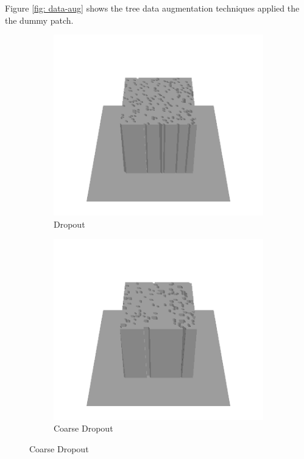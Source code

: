 \documentclass[../document.tex]{subfiles}
\begin{document}
Figure \ref{fig: data-aug} shows the tree data augmentation techniques applied the the dummy patch.
\begin{figure}[htbp]
    \centering
        \begin{subfigure}[b]{0.32\textwidth}
            \includegraphics[width=\textwidth]{../img/data-aug/3d/center-dropout-mayavi.png}
            \caption{Dropout}
        \end{subfigure}
        \begin{subfigure}[b]{0.32\linewidth}
            \includegraphics[width=\textwidth]{../img/data-aug/3d/center-coarse-dropout-mayavi.png}
            \caption{Coarse Dropout}
            \end{subfigure}    


\end{figure}
\end{document}
